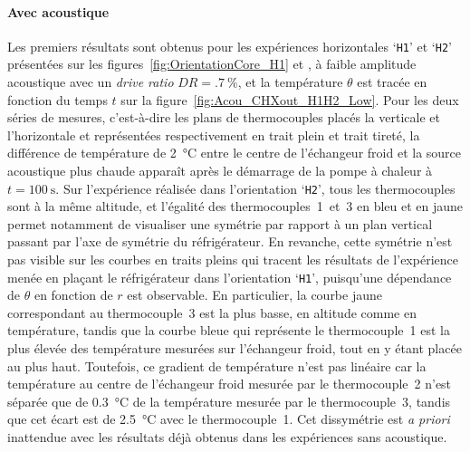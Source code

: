 \paragraph{Avec acoustique}\label{chap:Acou_CHXout_H1H2_low}
Les premiers résultats sont obtenus pour les expériences horizontales `\texttt{H1}' et `\texttt{H2}' présentées sur les figures~\ref{fig:OrientationCore_H1} et , à faible amplitude acoustique avec un \textit{drive ratio} $DR=\qty{.7}{\percent}$, et la température $\theta$ est tracée en fonction du temps $t$ sur la figure~\ref{fig:Acou_CHXout_H1H2_Low}. Pour les deux séries de mesures, c'est-à-dire les plans de thermocouples placés la verticale et l'horizontale et représentées respectivement en trait plein et trait tireté, la différence de température de \qty{2}{\degreeCelsius} entre le centre de l'échangeur froid et la source acoustique plus chaude apparaît après le démarrage de la pompe à chaleur à $t=\qty{100}{\second}$. Sur l'expérience réalisée dans l'orientation `\texttt{H2}', tous les thermocouples sont à la même altitude, et l'égalité des thermocouples~1~et~3 en bleu et en jaune permet notamment de visualiser une symétrie par rapport à un plan vertical passant par l'axe de symétrie du réfrigérateur. En revanche, cette symétrie n'est pas visible sur les courbes en traits pleins qui tracent les résultats de l'expérience menée en plaçant le réfrigérateur dans l'orientation `\texttt{H1}', puisqu'une dépendance de $\theta$ en fonction de $r$ est observable. En particulier, la courbe jaune correspondant au thermocouple~3 est la plus basse, en altitude comme en température, tandis que la courbe bleue qui représente le thermocouple~1 est la plus élevée des température mesurées sur l'échangeur froid, tout en y étant placée au plus haut. Toutefois, ce gradient de température n'est pas linéaire car la température au centre de l'échangeur froid mesurée par le thermocouple~2 n'est séparée que de \qty{.3}{\degreeCelsius} de la température mesurée par le thermocouple~3, tandis que cet écart est de \qty{2.5}{\degreeCelsius} avec le thermocouple~1. Cet dissymétrie est \textit{a priori} inattendue avec les résultats déjà obtenus dans les expériences sans acoustique.
\smallskip

